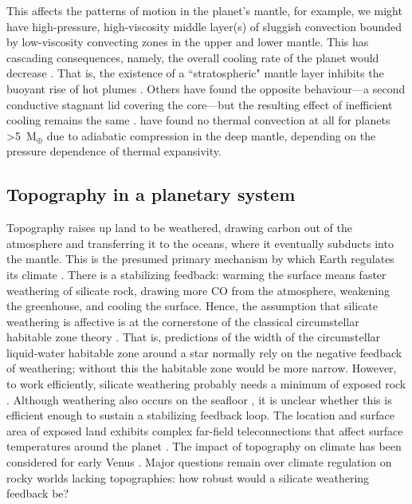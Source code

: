 This affects the patterns of motion in the planet's mantle, for example, we might have high-pressure, high-viscosity middle layer(s) of sluggish convection bounded by low-viscosity convecting zones in the upper and lower mantle. This has cascading consequences, namely, the overall cooling rate of the planet would decrease \citep{Shahnas2018}. That is, the existence of a ``stratospheric" mantle layer inhibits the buoyant rise of hot plumes \citep{Kameyama2013, Miyagoshi2014}. Others have found the opposite behaviour---a second conductive stagnant lid covering the core---but the resulting effect of inefficient cooling remains the same \citep{Stamenkovic2012, Kameyama2016}. \citet{Tachinami2014} have found no thermal convection at all for planets \textgreater 5~M$_\oplus$ due to adiabatic compression in the deep mantle, depending on the pressure dependence of thermal expansivity.

\subsection{Topography in a planetary system}

Topography raises up land to be weathered, drawing carbon out of the atmosphere and transferring it to the oceans, where it eventually subducts into the mantle. This is the presumed primary mechanism by which Earth regulates its climate \citep{Walker1981}. There is a stabilizing feedback: warming the surface means faster weathering of silicate rock, drawing more CO from the atmosphere, weakening the greenhouse, and cooling the surface. Hence, the assumption that silicate weathering is affective is at the cornerstone of the classical circumstellar habitable zone theory \citep{Kasting1993}. That is, predictions of the width of the circumstellar liquid-water habitable zone around a star normally rely on the negative feedback of weathering; without this the habitable zone would be more narrow. However, to work efficiently, silicate weathering probably needs a minimum of exposed rock \citep{Abbot2012}. Although weathering also occurs on the seafloor \citep{Krissansen-Totton2017}, it is unclear whether this is efficient enough to sustain a stabilizing feedback loop. The location and surface area of exposed land exhibits complex far-field teleconnections that affect surface temperatures around the planet \citep{Sohl2017}. The impact of topography on climate has been considered for early Venus \citep{Way2016}. Major questions remain over climate regulation on rocky worlds lacking topographies: how robust would a silicate weathering feedback be? 


